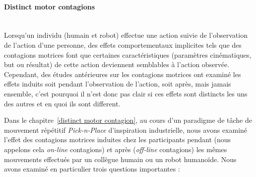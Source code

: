 \paragraph*{\LARGE {Distinct motor contagions \\}\\}

Lorsqu'un individu (humain et robot) effectue une action suivie de l'observation de l'action d'une personne, des effets comportementaux implicites tels que des contagions motrices font que certaines caractéristiques (paramètres cinématiques, but ou résultat) de cette action deviennent semblables à l'action observée. Cependant, des études antérieures sur les contagions motrices ont examiné les effets induits soit pendant l'observation de l'action, soit après, mais jamais ensemble, c'est pourquoi il n'est donc pas clair si ces effets sont distincts les uns des autres et en quoi ils sont different.



Dans le chapitre~\ref{distinct motor contagion}, au cours d'un paradigme de tâche de mouvement répétitif \textit{Pick-n-Place} d'inspiration industrielle, nous avons examiné l'effet des contagions motrices induites chez les participants pendant (nous appelons cela \textit{on-line} contagions) et après (\textit{off-line} contagions) les mêmes mouvements effectués par un collègue humain ou un robot humanoïde. Nous avons examiné en particulier trois questions importantes :




